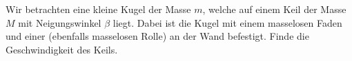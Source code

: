 \begin{Exercise}[origin = Jaan Kalda, difficulty = 4, title = Keil, label = wedge1]
	Wir betrachten eine kleine Kugel der Masse $m$, welche auf einem Keil der Masse $M$ mit Neigungswinkel $\beta$ liegt. Dabei ist die Kugel mit einem masselosen Faden und einer (ebenfalls masselosen Rolle) an der Wand befestigt. Finde die Geschwindigkeit des Keils.
\end{Exercise}